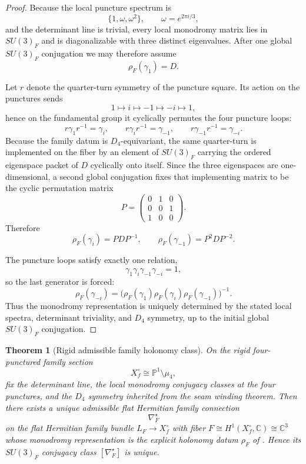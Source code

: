 \documentclass[11pt,a4paper]{article}
\newtheorem{theorem}{Theorem}[section]
\theoremstyle{definition}
\theoremstyle{remark}
\begin{document}
\begin{proof}
Because the local puncture spectrum is
\[
\{1,\omega,\omega^2\},
\qquad
\omega=e^{2\pi i/3},
\]
and the determinant line is trivial, every local monodromy matrix lies in $SU(3)_F$ and is
diagonalizable with three distinct eigenvalues. After one global $SU(3)_F$ conjugation we may
therefore assume
\[
\rho_F(\gamma_1)=D.
\]

Let $r$ denote the quarter-turn symmetry of the puncture square. Its action on the punctures sends
\[
1\mapsto i\mapsto -1\mapsto -i\mapsto 1,
\]
hence on the fundamental group it cyclically permutes the four puncture loops:
\[
r\gamma_1r^{-1}=\gamma_i,
\qquad
r\gamma_ir^{-1}=\gamma_{-1},
\qquad
r\gamma_{-1}r^{-1}=\gamma_{-i}.
\]
Because the family datum is $D_4$-equivariant, the same quarter-turn is implemented on the fiber by
an element of $SU(3)_F$ carrying the ordered eigenspace packet of $D$ cyclically onto itself. Since
the three eigenspaces are one-dimensional, a second global conjugation fixes that implementing
matrix to be the cyclic permutation matrix
\[
P=
\begin{pmatrix}
0&1&0\\
0&0&1\\
1&0&0
\end{pmatrix}.
\]
Therefore
\[
\rho_F(\gamma_i)=PDP^{-1},
\qquad
\rho_F(\gamma_{-1})=P^2DP^{-2}.
\]

The puncture loops satisfy exactly one relation,
\[
\gamma_1\gamma_i\gamma_{-1}\gamma_{-i}=1,
\]
so the last generator is forced:
\[
\rho_F(\gamma_{-i})
=
\bigl(\rho_F(\gamma_1)\rho_F(\gamma_i)\rho_F(\gamma_{-1})\bigr)^{-1}.
\]
Thus the monodromy representation is uniquely determined by the stated local spectra, determinant
triviality, and $D_4$ symmetry, up to the initial global $SU(3)_F$ conjugation.
\end{proof}

\begin{theorem}[Rigid admissible family holonomy class]
\label{thm:rigid-family-local-system}
On the rigid four-punctured family section
\[
X_f^\circ\cong \mathbb P^1\setminus\mu_4,
\]
fix the determinant line, the local monodromy conjugacy classes at the four punctures, and the
$D_4$ symmetry inherited from the seam winding theorem. Then there exists a unique admissible
flat Hermitian family connection
\[
\nabla_F^\star
\]
on the flat Hermitian family bundle $L_F\to X_f^\circ$ with fiber
$F\cong H^1(X_f^\circ,\mathbb C)\cong\mathbb C^3$ whose monodromy representation is the explicit
holonomy datum $\rho_F$ of
. Hence its $SU(3)_F$
conjugacy class $[\nabla_F^\star]$ is unique.
\end{theorem}
\end{document}
